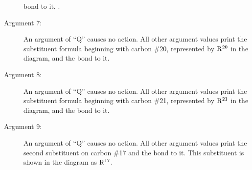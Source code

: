 \begin{description}
      bond to it.
      \ru .
 \item[{\rm Argument 7:}] An argument of ``Q''
      causes no action. All other argument values print
      the substituent formula beginning with carbon \#20,
      represented by ${\rm R^{20}}$ in the diagram, and the
      bond to it.
 \item[{\rm Argument 8:}] An argument of ``Q''
      causes no action. All other argument values print
      the substituent formula beginning with carbon \#21,
      represented by ${\rm R^{21}}$ in the diagram,
      and the bond to it.
 \item[{\rm Argument 9:}] An argument of ``Q''
      causes no action. All other argument values print
      the second substituent on carbon \#17 and the bond
      to it. This substituent is shown in the diagram
      as ${\rm R^{17}}$.
 \end{description}
 
 
 
